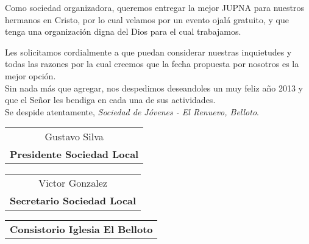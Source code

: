 \documentclass[12pt,letterpaper]{article}
\begin{document}
Como sociedad organizadora, queremos entregar la mejor JUPNA para nuestros hermanos en Cristo, por lo cual velamos por un evento ojalá gratuito, y que tenga una organización digna del Dios para el cual trabajamos.

Les solicitamos cordialmente a que puedan considerar nuestras inquietudes y todas las razones por la cual creemos que la fecha propuesta por nosotros es la mejor opción.\\

Sin nada más que agregar, nos despedimos deseandoles un muy feliz año 2013 y que el Señor les bendiga en cada una de sus actividades.\\

Se despide atentamente, \textit{Sociedad de Jóvenes - El Renuevo, Belloto}.

\vspace{50px}

\begin{table}[!h]
\centering
\begin{tabular}{c}
\hline
Gustavo Silva\\
\textbf{Presidente Sociedad Local}
\end{tabular}
\hspace{30px}
\begin{tabular}{c}
\hline
Victor Gonzalez\\
\textbf{Secretario Sociedad Local}
\end{tabular}
\end{table}

\vspace{50px}

\begin{table}[!h]
\centering
\begin{tabular}{c}
\hline
\textbf{Consistorio Iglesia El Belloto}
\end{tabular}
\end{table}
\end{document}
